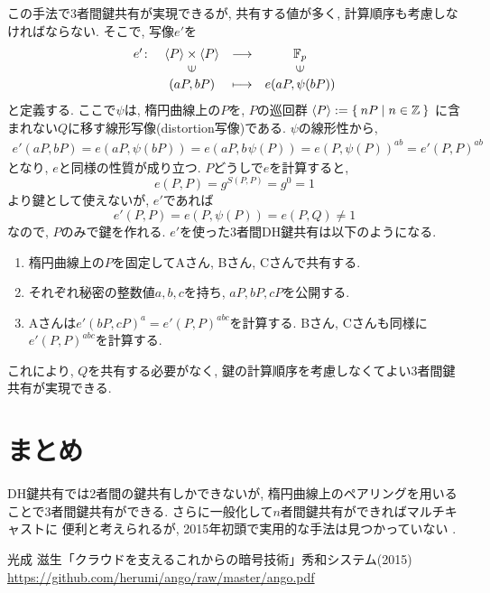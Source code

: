\documentclass[a4paper,11pt]{jsarticle}
\begin{document}
この手法で3者間鍵共有が実現できるが, 共有する値が多く, 
計算順序も考慮しなければならない.
そこで, 写像$e'$を
\[
  \begin{array}{rccc}
    e' \colon & \left<P\right> \times \left<P\right> & \longrightarrow & \mathbb{F}_p \\
      & \rotatebox{90}{$\in$} & & \rotatebox{90}{$\in$} \\
      & (aP, bP) & \longmapsto & e(aP, \psi(bP))
  \end{array}
\]
と定義する.
ここで$\psi$は, 楕円曲線上の$P$を, $P$の巡回群
$\left<P\right> := \Set{nP | n \in \mathbb{Z}}$
に含まれない$Q$に移す線形写像(distortion写像)である\cite[p.86]{bib1}.
$\psi$の線形性から,
\begin{eqnarray*}
  e'(aP, bP) = e(aP, \psi(bP)) = e(aP, b\hspace{1pt}\psi(P)) = e(P, \psi(P))^{ab} = e'(P, P)^{ab}
\end{eqnarray*}
となり, $e$と同様の性質が成り立つ.
$P$どうしで$e$を計算すると, 
\[
  e(P, P) = g^{S(P, P)} = g^0 = 1
\]
より鍵として使えないが, $e'$であれば
\[
  e'(P, P) = e(P, \psi(P)) = e(P, Q) \neq 1
\]
なので, $P$のみで鍵を作れる.
$e'$を使った3者間DH鍵共有は以下のようになる.
\begin{enumerate}
  \item 楕円曲線上の$P$を固定してAさん, Bさん, Cさんで共有する.
  \item それぞれ秘密の整数値$a, b, c$を持ち, $aP, bP, cP$を公開する.
  \item Aさんは$e'(bP, cP)^a = e'(P, P)^{abc}$を計算する.
    Bさん, Cさんも同様に$e'(P, P)^{abc}$を計算する.
\end{enumerate}
これにより, $Q$を共有する必要がなく, 
鍵の計算順序を考慮しなくてよい3者間鍵共有が実現できる.

\section{まとめ}
DH鍵共有では2者間の鍵共有しかできないが, 
楕円曲線上のペアリングを用いることで3者間鍵共有ができる.
さらに一般化して$n$者間鍵共有ができればマルチキャストに
便利と考えられるが, 2015年初頭で実用的な手法は見つかっていない
\cite[p.84]{bib1}.

\begin{thebibliography}{99}
  光成 滋生「クラウドを支えるこれからの暗号技術」秀和システム(2015) \url{https://github.com/herumi/ango/raw/master/ango.pdf}
\end{thebibliography}
\end{document}
